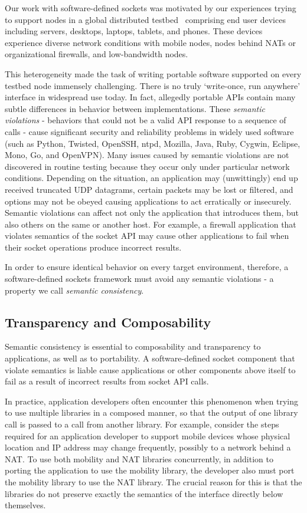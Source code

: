 Our work with software-defined sockets was motivated by our experiences trying 
to support nodes in a global distributed testbed~\cite{Seattle_SIGCSE09} comprising 
end user devices including servers, desktops, laptops, tablets, and phones.
These devices experience diverse network conditions with mobile nodes, 
nodes behind NATs or organizational firewalls, and low-bandwidth nodes.

This heterogeneity made the task of writing portable software supported on every testbed node 
immensely challenging. There is no truly `write-once, run anywhere' interface in 
widespread use today. In fact, allegedly portable APIs contain many subtle differences 
in behavior between implementations. These \emph{semantic violations} - behaviors 
that could not be a valid API response to a sequence of calls - cause significant 
security and reliability problems in widely used software (such as Python, Twisted, 
OpenSSH, ntpd, Mozilla, Java, Ruby, Cygwin, Eclipse, Mono, Go, and OpenVPN).
Many issues caused by semantic violations are not discovered in routine testing because they occur 
only under particular network conditions. Depending on the situation, an application 
may (unwittingly) end up received truncated UDP datagrams, certain packets may be 
lost or filtered, and options may not be obeyed causing applications to act 
erratically or insecurely. Semantic violations can affect not only the application 
that introduces them, but also others on the same or another host. For example, 
a firewall application that violates semantics of the socket API may cause other 
applications to fail when their socket operations produce incorrect results.

In order to ensure identical behavior on every target environment, therefore, 
a software-defined sockets framework must avoid any semantic violations - 
a property we call \emph{semantic consistency}.

\subsection{Transparency and Composability}
\label{subsec:overview-semantics}

Semantic consistency is essential to composability and transparency to applications, 
as well as to portability.
A software-defined socket component that violate semantics is liable cause 
applications or other components above itself 
to fail as a result of incorrect results from socket API calls. 

In practice, application developers often encounter this phenomenon 
when trying to use multiple libraries in a composed manner, so that the 
output of one library call is passed to a call from another library.
For example, consider the steps required for an application developer  
to support mobile devices whose physical location and IP address may 
change frequently, possibly to a network behind a NAT.  
To use both mobility and NAT libraries concurrently, in addition to porting the 
application to use the mobility library, the developer also must port the 
mobility library to use the NAT library. The crucial reason for this is that 
the libraries do not preserve exactly the semantics of the interface directly 
below themselves.


